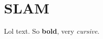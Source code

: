 \documentclass[Main]{subfiles}
\begin{document}
\section{SLAM} %
	\label{sec:slam}

	Lol text.
	So \textbf{bold}, very \emph{cursive}.

\end{document}
